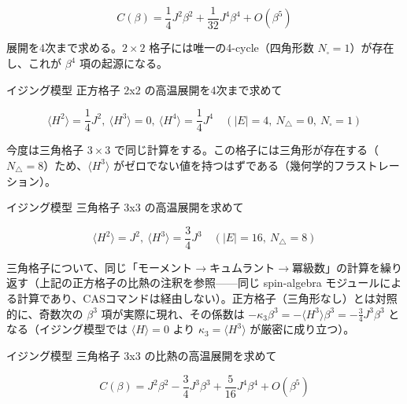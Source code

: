\documentclass[dvipdfmx,a4paper,11pt]{jsarticle}
\begin{document}
\begin{equation}
  C(\beta) = \frac{1}{4} J^{2} \beta^{2} + \frac{1}{32} J^{4} \beta^{4} + O(\beta^5)
  \label{eq:E3}
\end{equation}

展開を4次まで求める。$2\times2$ 格子には唯一の4-cycle（四角形数 $N_\square=1$）が存在し、これが $\beta^4$ 項の起源になる。

イジング模型 正方格子 2x2 の高温展開を4次まで求めて

\begin{equation}
  \langle H^2 \rangle = \frac{1}{4} J^{2},\ \langle H^3 \rangle = 0,\ \langle H^4 \rangle = \frac{1}{4} J^{4} \quad (|E| = 4,\ N_\triangle = 0,\ N_\square = 1)
  \label{eq:E4}
\end{equation}

今度は三角格子 $3\times3$ で同じ計算をする。この格子には三角形が存在する（$N_\triangle=8$）ため、$\langle H^3\rangle$ がゼロでない値を持つはずである（幾何学的フラストレーション）。

イジング模型 三角格子 3x3 の高温展開を求めて

\begin{equation}
  \langle H^2 \rangle = J^{2},\ \langle H^3 \rangle = \frac{3}{4} J^{3} \quad (|E| = 16,\ N_\triangle = 8)
  \label{eq:E5}
\end{equation}

三角格子について、同じ「モーメント$\to$キュムラント$\to$冪級数」の計算を繰り返す（上記の正方格子の比熱の注釈を参照——同じ spin-algebra モジュールによる計算であり、CASコマンドは経由しない）。正方格子（三角形なし）とは対照的に、奇数次の $\beta^3$ 項が実際に現れ、その係数は $-\kappa_3\beta^3=-\langle H^3\rangle\beta^3=-\tfrac34J^3\beta^3$ となる（イジング模型では $\langle H\rangle=0$ より $\kappa_3=\langle H^3\rangle$ が厳密に成り立つ）。

イジング模型 三角格子 3x3 の比熱の高温展開を求めて

\begin{equation}
  C(\beta) = J^{2} \beta^{2} - \frac{3}{4} J^{3} \beta^{3} + \frac{5}{16} J^{4} \beta^{4} + O(\beta^5)
  \label{eq:E6}
\end{equation}
\end{document}
